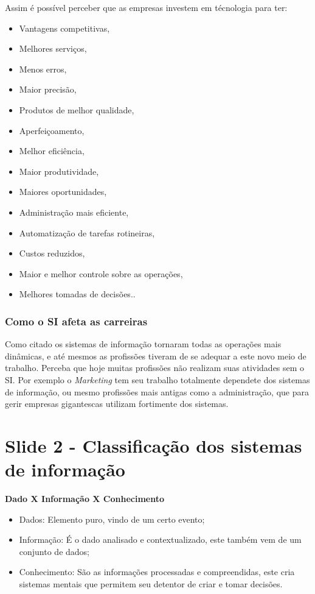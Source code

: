 \documentclass[
	12pt,				%
	openany,			%
	a4paper,			%
	chapter=TITLE,		%
	section=TITLE,		%
	english,
	brazil				%
]{abntex2}
\begin{document}
\begin{itemize}
Assim é possível perceber que as empresas investem em técnologia para ter:
	\begin{itemize}
		\item Vantagens competitivas,
		\item Melhores serviços,
		\item Menos erros,
		\item Maior precisão,
		\item Produtos de melhor qualidade,
		\item Aperfeiçoamento,
		\item Melhor eficiência,
		\item Maior produtividade,
		\item Maiores oportunidades,
		\item Administração mais eficiente,
		\item Automatização de tarefas rotineiras,
		\item Custos reduzidos,
		\item Maior e melhor controle sobre as operações,
		\item Melhores tomadas de decisões..
	\end{itemize}

\subsection{Como o SI afeta as carreiras}
Como citado os sistemas de informação tornaram todas as operações mais dinâmicas, e até mesmos as profissões tiveram de se adequar a este novo meio de trabalho. Perceba que hoje muitas profissões não realizam suas atividades sem o SI. Por exemplo o \textit{Marketing} tem seu trabalho totalmente dependete dos sistemas de informação, ou mesmo profissões mais antigas como a administração, que para gerir empresas gigantescas utilizam fortimente dos sistemas.




\chapter{Slide 2 - Classificação dos sistemas de informação}

\textbf{Dado X Informação X Conhecimento}
	\begin{itemize}
		\item Dados: Elemento puro, vindo de um certo evento;
		\item Informação: É o dado analisado e contextualizado, este também vem de um conjunto de dados;
		\item Conhecimento: São as informações processadas e compreendidas, este cria sistemas mentais que permitem seu detentor de criar e tomar decisões.
	\end{itemize}


\end{itemize}
\end{document}
